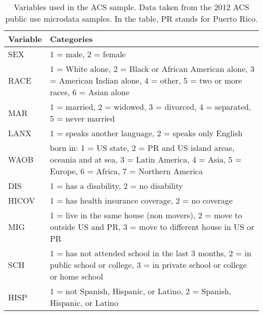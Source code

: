 \documentclass[11pt]{article}
\begin{document}
\begin{table}
\centering
\begin{tabular}{p{0.7in} p{5.5in}}
Variable &  Categories \\ \hline
SEX &  1 = male, 2 = female \\
RACE& 1 = White alone, 2 = Black or African American alone, 3 = American Indian alone, 4 = other,  5 = two or more races, 6 = Asian alone \\
MAR &  1 = married, 2 = widowed, 3 = divorced, 4 = separated, 5 = never married \\
LANX & 1 = speaks another language, 2 = speaks only English \\
WAOB & born in: 1 = US state, 2 = PR and US island areas, oceania and at sea, 3 = Latin America, 4 = Asia,
5 = Europe, 6 = Africa, 7 = Northern America \\
DIS &  1 = has a disability, 2 = no disability \\
HICOV & 1 = has health insurance coverage, 2 = no coverage \\
MIG & 1 = live in the same house (non movers), 2 = move to outside US and PR, 3 = move to different house in US or PR  \\
SCH & 1 = has not attended school in the last 3 months, 2 = in public school or college, 3 = in private school or college or home school \\
HISP & 1 = not Spanish, Hispanic, or Latino, 2 = Spanish, Hispanic, or Latino  \\ \hline
\end{tabular}
\caption{Variables used in the ACS sample. Data taken
  from the 2012 ACS public use microdata
  samples. In the table, PR stands for Puerto Rico.}
\end{table}
\end{document}
